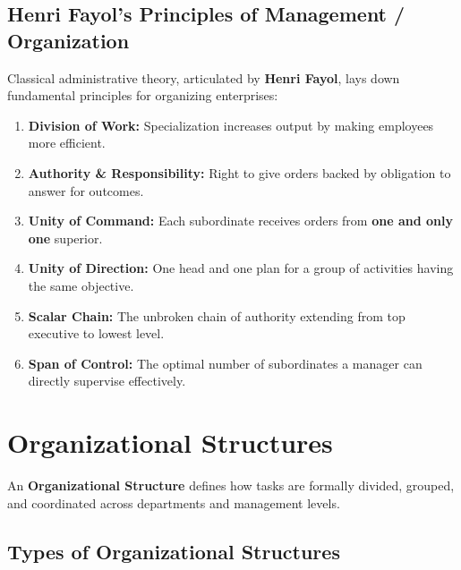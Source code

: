 \documentclass[12pt,a4paper]{article}
\begin{document}
\subsection{Henri Fayol's Principles of Management / Organization}
Classical administrative theory, articulated by \textbf{Henri Fayol}, lays down fundamental principles for organizing enterprises:

\begin{tcolorbox}[formulabox, title={Core Administrative Principles (Fayol)}]
  \begin{enumerate}[leftmargin=*, itemsep=3pt]
    \item \textbf{Division of Work:} Specialization increases output by making employees more efficient.
    \item \textbf{Authority \& Responsibility:} Right to give orders backed by obligation to answer for outcomes.
    \item \textbf{Unity of Command:} Each subordinate receives orders from \textbf{one and only one} superior.
    \item \textbf{Unity of Direction:} One head and one plan for a group of activities having the same objective.
    \item \textbf{Scalar Chain:} The unbroken chain of authority extending from top executive to lowest level.
    \item \textbf{Span of Control:} The optimal number of subordinates a manager can directly supervise effectively.
  \end{enumerate}
\end{tcolorbox}

\section{Organizational Structures}

An \textbf{Organizational Structure} defines how tasks are formally divided, grouped, and coordinated across departments and management levels.

\subsection{Types of Organizational Structures}
\end{document}
